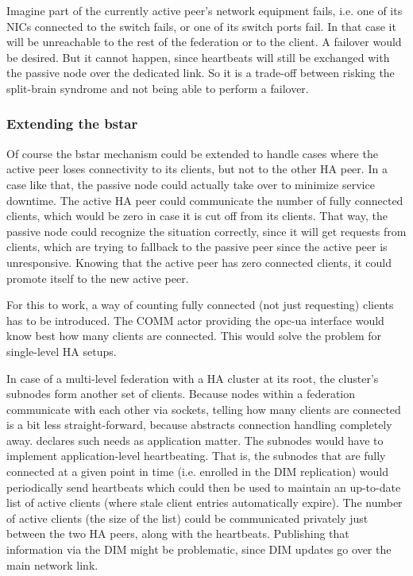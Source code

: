 Imagine part of the currently active peer's network equipment fails, i.e. one
of its \glspl{NIC} connected to the switch fails, or one of its switch ports
fail. In that case it will be unreachable to the rest of the
federation or to the client. A failover would be desired. But it
cannot happen, since heartbeats will still be exchanged with the passive node over
the dedicated link. So it is a trade-off between risking the split-brain
syndrome and not being able to perform a failover.

\subsubsection{Extending the \gls{bstar}}\label{sec:approach:ha:bstar-ext}
Of course the \gls{bstar} mechanism could be extended to handle cases where the
active peer loses connectivity to its clients, but not to the other HA peer. In
a case like that, the passive node could actually take over to minimize
service downtime. The active HA peer could communicate the number of fully connected clients,
which would be zero in case it is cut off from its clients. That way, the
passive node could recognize the situation correctly, since it will get
requests from clients, which are trying to fallback to the passive peer since
the active peer is unresponsive. Knowing that the active peer has zero
connected clients, it could promote itself to the new active peer.

For this to work, a way of counting fully connected (not just requesting)
clients has to be introduced. The COMM actor providing the \gls{opc-ua}
interface would know best how many clients are connected. This would solve the problem for single-level HA setups.

In case of a multi-level federation with a HA cluster at its root, the
cluster's subnodes form another set of clients. Because nodes within a
federation communicate with each other via \zmq sockets, telling how many
clients are connected is a bit less straight-forward, because \zmq abstracts
connection handling completely away. \zmq declares such needs as application matter.
The subnodes would have to implement application-level heartbeating.
That is, the subnodes that are fully connected at a given point in time (i.e. enrolled
in the DIM replication) would periodically send heartbeats which could then be
used to maintain an up-to-date list of active clients (where stale client
entries automatically expire).  The number of active clients (the size of the
list) could be communicated privately just between the two HA peers, along with
the heartbeats. Publishing that information via the DIM might be problematic,
since DIM updates go over the main network link.

